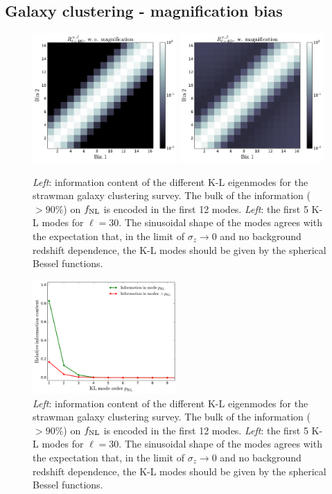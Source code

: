 \documentclass[twocolumn,amsfont,amssymb,amsmath, showpacs,balancelastpage, nofootinbib]{revtex4-1}
\begin{document}
  \subsection{Galaxy clustering - magnification bias}\label{ssec:results.mag}  
    \begin{figure}
      \centering
      \includegraphics[width=0.49\textwidth]{Figs/r_ij_mb_wom}
      \includegraphics[width=0.49\textwidth]{Figs/r_ij_mb_wm}
      \caption{{\sl Left}: information content of the different K-L eigenmodes for the strawman galaxy clustering survey. The bulk of the information ($>90\%$) on $f_{\rm NL}$ is encoded in the first 12 modes. {\sl Left}: the first 5 K-L modes for $\ell=30$. The sinusoidal shape of the modes agrees with the expectation that, in the limit of $\sigma_z\rightarrow0$ and no background redshift dependence, the K-L modes should be given by the spherical Bessel functions. }\label{fig:r_ij_wm}
    \end{figure}
    \begin{figure}
      \centering
      \includegraphics[width=0.49\textwidth]{Figs/information_mb}
      \caption{{\sl Left}: information content of the different K-L eigenmodes for the strawman galaxy clustering survey. The bulk of the information ($>90\%$) on $f_{\rm NL}$ is encoded in the first 12 modes. {\sl Left}: the first 5 K-L modes for $\ell=30$. The sinusoidal shape of the modes agrees with the expectation that, in the limit of $\sigma_z\rightarrow0$ and no background redshift dependence, the K-L modes should be given by the spherical Bessel functions. }\label{fig:kl_mb}
    \end{figure}
\end{document}
